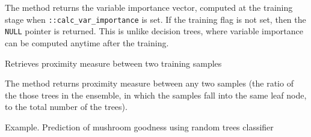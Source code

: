 The method returns the variable importance vector, computed at the training stage when \texttt{::calc\_var\_importance} is set. If the training flag is not set, then the \texttt{NULL} pointer is returned. This is unlike decision trees, where variable importance can be computed anytime after the training.



Retrieves proximity measure between two training samples


The method returns proximity measure between any two samples (the ratio of the those trees in the ensemble, in which the samples fall into the same leaf node, to the total number of the trees).


Example. Prediction of mushroom goodness using random trees classifier

